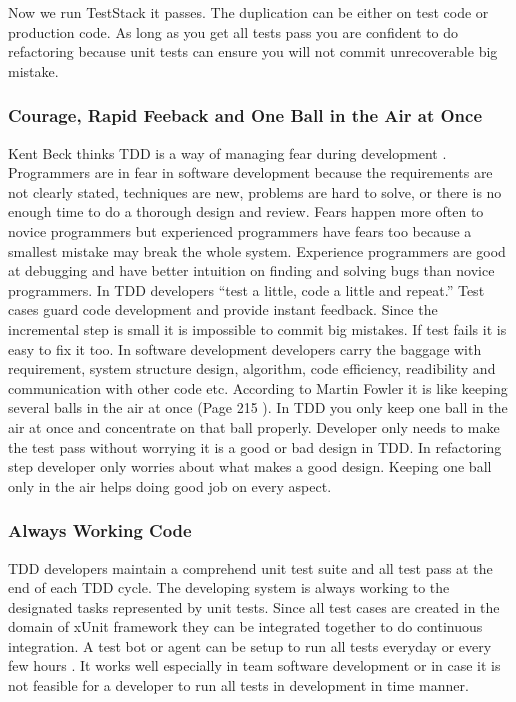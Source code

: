 Now we run TestStack it passes. The duplication can be either on test code
or production code. As long as you get all tests pass you are confident to
do refactoring because unit tests can ensure you will not commit
unrecoverable big mistake.

\subsubsection{Courage, Rapid Feeback and One Ball in the Air at Once}
Kent Beck thinks TDD is a way of managing fear during development
\cite{Beck:03}. Programmers are in fear in software development because the
requirements are not clearly stated, techniques are new, problems are hard
to solve, or there is no enough time to do a thorough design and review.
Fears happen more often to novice programmers but experienced programmers
have fears too because a smallest mistake may break the whole system.
Experience programmers are good at debugging and have better intuition on
finding and solving bugs than novice programmers. In TDD developers ``test
a little, code a little and repeat.''\cite{Beck:03} Test cases guard code
development and provide instant feedback. Since the incremental step is
small it is impossible to commit big mistakes. If test fails it is easy to
fix it too. In software development developers carry the baggage with
requirement, system structure design, algorithm, code efficiency,
readibility and communication with other code etc. According to Martin
Fowler it is like keeping several balls in the air at once (Page 215
\cite{Beck:03}).  In TDD you only keep one ball in the air at once and
concentrate on that ball properly. Developer only needs to make the test
pass without worrying it is a good or bad design in TDD. In refactoring
step developer only worries about what makes a good design. Keeping one
ball only in the air helps doing good job on every aspect.

\subsubsection{Always Working Code}
TDD developers maintain a comprehend unit test suite and all test pass at
the end of each TDD cycle. The developing system is always working to the
designated tasks represented by unit tests. Since all test cases are
created in the domain of xUnit framework they can be integrated together to
do continuous integration. A test bot or agent can be setup to run all
tests everyday or every few hours \cite{ContinuousIntegration}. It works
well especially in team software development or in case it is not feasible
for a developer to run all tests in development in time manner.

